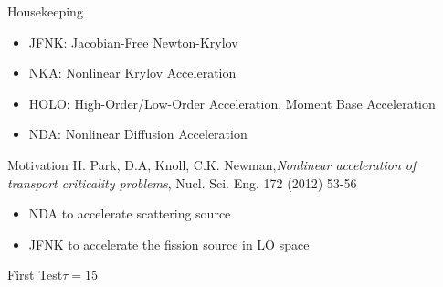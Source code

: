 \documentclass[sans,mathserif,aspectratio=169]{beamer}
\begin{document}
\begin{frame}{Housekeeping}
\begin{itemize}
  \item<1> JFNK: Jacobian-Free Newton-Krylov
  \item<1> NKA: Nonlinear Krylov Acceleration
  \item<2> HOLO: High-Order/Low-Order Acceleration, Moment Base Acceleration
  \item<2> NDA: Nonlinear Diffusion Acceleration
\end{itemize}
\end{frame}

\begin{frame}{Motivation}
H. Park, D.A, Knoll, C.K. Newman,\emph{Nonlinear acceleration of transport criticality problems}, 
Nucl. Sci. Eng. 172 (2012) 53-56
\begin{itemize}
  \item NDA to accelerate scattering source
  \item JFNK to accelerate the fission source in LO space
\end{itemize}
\end{frame}

\begin{frame}{First Test}{$\tau = 15$}
\centering
{}
\end{frame}
\end{document}
